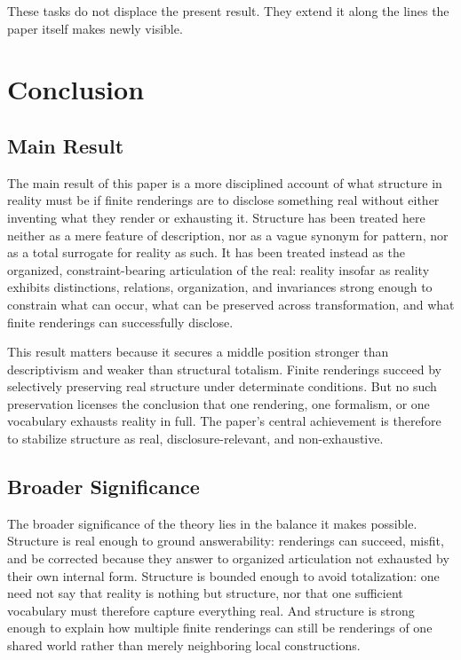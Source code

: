 \documentclass[11pt]{article}
\begin{document}
These tasks do not displace the present result. They extend it along the lines the paper itself makes newly visible.

\section{Conclusion}

\subsection{Main Result}

The main result of this paper is a more disciplined account of what structure in reality must be if finite renderings are to disclose something real without either inventing what they render or exhausting it. Structure has been treated here neither as a mere feature of description, nor as a vague synonym for pattern, nor as a total surrogate for reality as such. It has been treated instead as the organized, constraint-bearing articulation of the real: reality insofar as reality exhibits distinctions, relations, organization, and invariances strong enough to constrain what can occur, what can be preserved across transformation, and what finite renderings can successfully disclose.

This result matters because it secures a middle position stronger than descriptivism and weaker than structural totalism. Finite renderings succeed by selectively preserving real structure under determinate conditions. But no such preservation licenses the conclusion that one rendering, one formalism, or one vocabulary exhausts reality in full. The paper's central achievement is therefore to stabilize structure as real, disclosure-relevant, and non-exhaustive.

\subsection{Broader Significance}

The broader significance of the theory lies in the balance it makes possible. Structure is real enough to ground answerability: renderings can succeed, misfit, and be corrected because they answer to organized articulation not exhausted by their own internal form. Structure is bounded enough to avoid totalization: one need not say that reality is nothing but structure, nor that one sufficient vocabulary must therefore capture everything real. And structure is strong enough to explain how multiple finite renderings can still be renderings of one shared world rather than merely neighboring local constructions.
\end{document}
